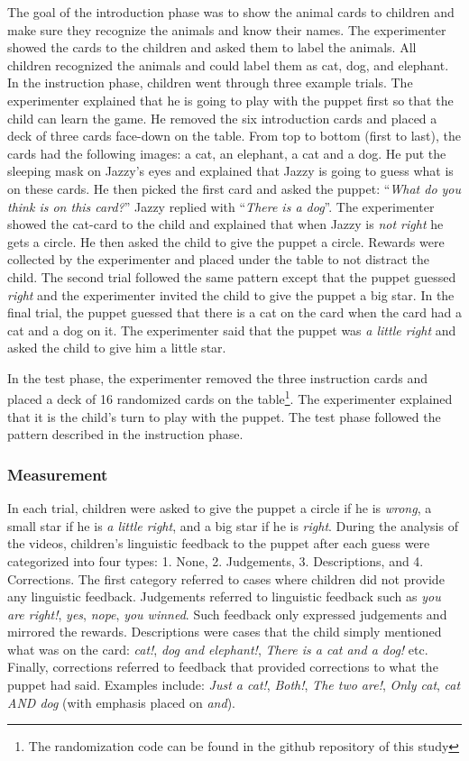 \documentclass[10pt, letterpaper]{article}
\begin{document}
The goal of the introduction phase was to show the animal cards to
children and make sure they recognize the animals and know their names.
The experimenter showed the cards to the children and asked them to
label the animals. All children recognized the animals and could label
them as cat, dog, and elephant. In the instruction phase, children went
through three example trials. The experimenter explained that he is
going to play with the puppet first so that the child can learn the
game. He removed the six introduction cards and placed a deck of three
cards face-down on the table. From top to bottom (first to last), the
cards had the following images: a cat, an elephant, a cat and a dog. He
put the sleeping mask on Jazzy's eyes and explained that Jazzy is going
to guess what is on these cards. He then picked the first card and asked
the puppet: ``\emph{What do you think is on this card?}'' Jazzy replied
with ``\emph{There is a dog}''. The experimenter showed the cat-card to
the child and explained that when Jazzy is \emph{not right} he gets a
circle. He then asked the child to give the puppet a circle. Rewards
were collected by the experimenter and placed under the table to not
distract the child. The second trial followed the same pattern except
that the puppet guessed \emph{right} and the experimenter invited the
child to give the puppet a big star. In the final trial, the puppet
guessed that there is a cat on the card when the card had a cat and a
dog on it. The experimenter said that the puppet was \emph{a little
right} and asked the child to give him a little star.

In the test phase, the experimenter removed the three instruction cards
and placed a deck of 16 randomized cards on the
table\footnote{The randomization code can be found in the github repository of this study}.
The experimenter explained that it is the child's turn to play with the
puppet. The test phase followed the pattern described in the instruction
phase.

\subsubsection{Measurement}\label{measurement}

In each trial, children were asked to give the puppet a circle if he is
\emph{wrong}, a small star if he is \emph{a little right}, and a big
star if he is \emph{right}. During the analysis of the videos,
children's linguistic feedback to the puppet after each guess were
categorized into four types: 1. None, 2. Judgements, 3. Descriptions,
and 4. Corrections. The first category referred to cases where children
did not provide any linguistic feedback. Judgements referred to
linguistic feedback such as \emph{you are right!}, \emph{yes},
\emph{nope}, \emph{you winned}. Such feedback only expressed judgements
and mirrored the rewards. Descriptions were cases that the child simply
mentioned what was on the card: \emph{cat!}, \emph{dog and elephant!},
\emph{There is a cat and a dog!} etc. Finally, corrections referred to
feedback that provided corrections to what the puppet had said. Examples
include: \emph{Just a cat!}, \emph{Both!}, \emph{The two are!},
\emph{Only cat}, \emph{cat AND dog} (with emphasis placed on
\emph{and}).
\end{document}
